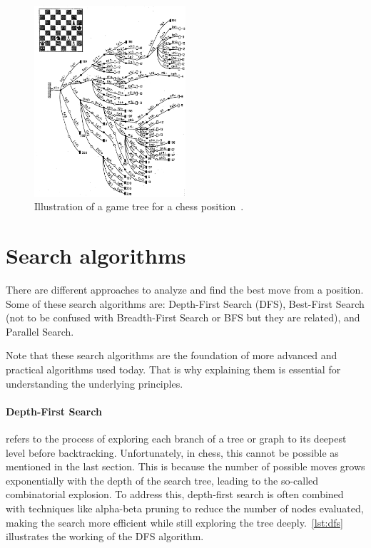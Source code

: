 \begin{figure}[t]
    \centering
    \includegraphics[width=0.5\textwidth]{Imagenes/chess-game-tree.jpg}
    \caption{Illustration of a game tree for a chess position~\cite{BotvinnikLongRangePlanning}.}\label{fig:game-tree}
\end{figure}

\section{Search algorithms}

There are different approaches to analyze and find the best move from a position. Some of these search algorithms are: Depth-First Search (DFS), Best-First Search (not to be confused with Breadth-First Search or BFS but they are related), and Parallel Search.

\vspace{1em}

\noindent Note that these search algorithms are the foundation of more advanced and practical algorithms used today. That is why explaining them is essential for understanding the underlying principles.

\paragraph{Depth-First Search} refers to the process of exploring each branch of a tree or graph to its deepest level before backtracking. Unfortunately, in chess, this cannot be possible as mentioned in the last section. This is because the number of possible moves grows exponentially with the depth of the search tree, leading to the so-called combinatorial explosion. To address this, depth-first search is often combined with techniques like alpha-beta pruning to reduce the number of nodes evaluated, making the search more efficient while still exploring the tree deeply.~\cref{lst:dfs} illustrates the working of the DFS algorithm.

